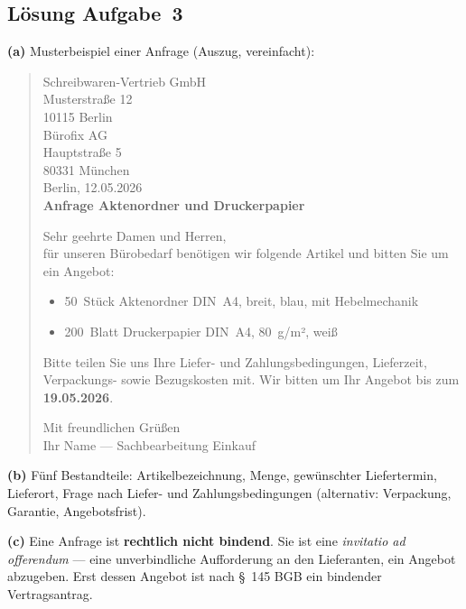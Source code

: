 \documentclass[11pt, a4paper]{article}
\begin{document}
\subsection*{Lösung Aufgabe~3}
\begin{loesung}
\textbf{(a)} Musterbeispiel einer Anfrage (Auszug, vereinfacht):

\begin{quote}\small
Schreibwaren-Vertrieb GmbH \\
Musterstraße 12 \\
10115 Berlin \\

\medskip
Bürofix AG \\
Hauptstraße 5 \\
80331 München \\

\medskip
Berlin, 12.05.2026 \\

\medskip
\textbf{Anfrage Aktenordner und Druckerpapier}

\medskip
Sehr geehrte Damen und Herren, \\

\medskip
für unseren Bürobedarf benötigen wir folgende Artikel und bitten Sie um ein Angebot:

\begin{itemize}[itemsep=0pt]
  \item 50~Stück Aktenordner DIN~A4, breit, blau, mit Hebelmechanik
  \item 200~Blatt Druckerpapier DIN~A4, 80~g/m², weiß
\end{itemize}

\smallskip
Bitte teilen Sie uns Ihre Liefer- und Zahlungs­bedingungen, Liefer­zeit, Verpackungs- sowie
Bezugskosten mit. Wir bitten um Ihr Angebot bis zum \textbf{19.05.2026}.

\medskip
Mit freundlichen Grüßen \\
Ihr Name --- Sachbearbeitung Einkauf
\end{quote}

\textbf{(b)} Fünf Bestandteile: Artikel­bezeichnung, Menge, gewünschter Liefertermin,
Lieferort, Frage nach Liefer- und Zahlungsbedingungen (alternativ: Verpackung, Garantie, Angebotsfrist).

\textbf{(c)} Eine Anfrage ist \textbf{rechtlich nicht bindend}. Sie ist eine
\emph{invitatio ad offerendum} --- eine unverbindliche Aufforderung an den Lieferanten,
ein Angebot abzugeben. Erst dessen Angebot ist nach \S~145 BGB ein bindender Vertragsantrag.
\end{loesung}
\end{document}
